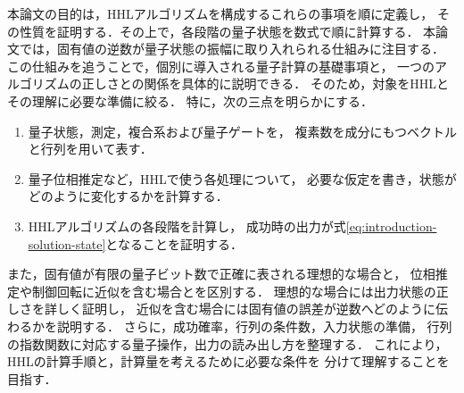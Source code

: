 本論文の目的は，HHLアルゴリズムを構成するこれらの事項を順に定義し，
その性質を証明する．その上で，各段階の量子状態を数式で順に計算する．
本論文では，固有値の逆数が量子状態の振幅に取り入れられる仕組みに注目する．
この仕組みを追うことで，個別に導入される量子計算の基礎事項と，
一つのアルゴリズムの正しさとの関係を具体的に説明できる．
そのため，対象をHHLとその理解に必要な準備に絞る．
特に，次の三点を明らかにする．
\begin{enumerate}[(1)]
  \item 量子状態，測定，複合系および量子ゲートを，
        複素数を成分にもつベクトルと行列を用いて表す．
  \item 量子位相推定など，HHLで使う各処理について，
        必要な仮定を書き，状態がどのように変化するかを計算する．
  \item HHLアルゴリズムの各段階を計算し，
        成功時の出力が式\eqref{eq:introduction-solution-state}となることを証明する．
\end{enumerate}

また，固有値が有限の量子ビット数で正確に表される理想的な場合と，
位相推定や制御回転に近似を含む場合とを区別する．
理想的な場合には出力状態の正しさを詳しく証明し，
近似を含む場合には固有値の誤差が逆数へどのように伝わるかを説明する．
さらに，成功確率，行列の条件数，入力状態の準備，
行列の指数関数に対応する量子操作，出力の読み出し方を整理する．
これにより，HHLの計算手順と，計算量を考えるために必要な条件を
分けて理解することを目指す．
